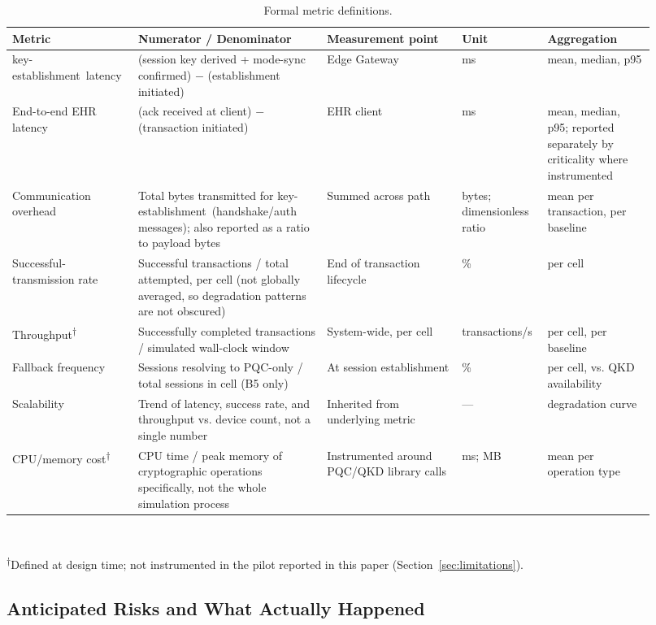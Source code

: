 \documentclass[journal]{IEEEtran}
\newcommand{\keyest}{key-establishment}
\begin{document}
\begin{table}[t]
\centering
\caption{Formal metric definitions.}
\label{tab:metricdefs}
\small
\begin{tabular}{@{}p{0.16\linewidth}p{0.28\linewidth}p{0.20\linewidth}p{0.12\linewidth}p{0.16\linewidth}@{}}
\toprule
Metric & Numerator / Denominator & Measurement point & Unit & Aggregation \\
\midrule
\keyest\ latency & (session key derived + mode-sync confirmed) $-$ (establishment initiated) & Edge Gateway & ms & mean, median, p95 \\
End-to-end EHR latency & (ack received at client) $-$ (transaction initiated) & EHR client & ms & mean, median, p95; reported separately by criticality where instrumented \\
Communication overhead & Total bytes transmitted for \keyest\ (handshake/auth messages); also reported as a ratio to payload bytes & Summed across path & bytes; dimensionless ratio & mean per transaction, per baseline \\
Successful-transmission rate & Successful transactions / total attempted, per cell (not globally averaged, so degradation patterns are not obscured) & End of transaction lifecycle & \% & per cell \\
Throughput\textsuperscript{$\dagger$} & Successfully completed transactions / simulated wall-clock window & System-wide, per cell & transactions/s & per cell, per baseline \\
Fallback frequency & Sessions resolving to PQC-only / total sessions in cell (B5 only) & At session establishment & \% & per cell, vs. QKD availability \\
Scalability & Trend of latency, success rate, and throughput vs. device count, not a single number & Inherited from underlying metric & --- & degradation curve \\
CPU/memory cost\textsuperscript{$\dagger$} & CPU time / peak memory of cryptographic operations specifically, not the whole simulation process & Instrumented around PQC/QKD library calls & ms; MB & mean per operation type \\
\bottomrule
\end{tabular}
\\ \raggedright \footnotesize \textsuperscript{$\dagger$}Defined at design time; not instrumented in the pilot reported in this paper (Section~\ref{sec:limitations}).
\end{table}

\subsection{Anticipated Risks and What Actually Happened}
\label{sec:anticipatedrisks}
\end{document}
